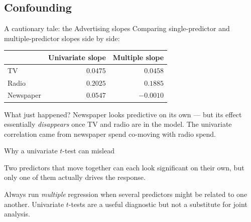 \documentclass[aspectratio=169,11pt]{beamer}
\begin{document}
\subsection{Confounding}

\begin{frame}{A cautionary tale: the Advertising slopes}\label{frm:confound}
  Comparing single-predictor and multiple-predictor slopes side by side:
  \begin{center}
  \begin{tabular}{lrr}
    \toprule
    & Univariate slope & Multiple slope \\
    \midrule
    TV         & $\phantom{-}0.0475$ & $\phantom{-}0.0458$ \\
    Radio      & $\phantom{-}0.2025$ & $\phantom{-}0.1885$ \\
    Newspaper  & $\phantom{-}0.0547$ & $-0.0010$ \\
    \bottomrule
  \end{tabular}
  \end{center}
  \begin{alertblock}{What just happened?}
    Newspaper looks predictive on its own --- but its effect essentially
    \emph{disappears} once TV and radio are in the model. The univariate
    correlation came from newspaper spend co-moving with radio spend.
  \end{alertblock}
\end{frame}

\begin{frame}{Why a univariate $t$-test can mislead}
  \begin{takeaway}
    Two predictors that move together can each look significant on
    their own, but only one of them actually drives the response.
  \end{takeaway}
  \begin{readme}
    Always run \emph{multiple} regression when several predictors might
    be related to one another. Univariate $t$-tests are a useful
    diagnostic but not a substitute for joint analysis.
  \end{readme}
\end{frame}
\end{document}
